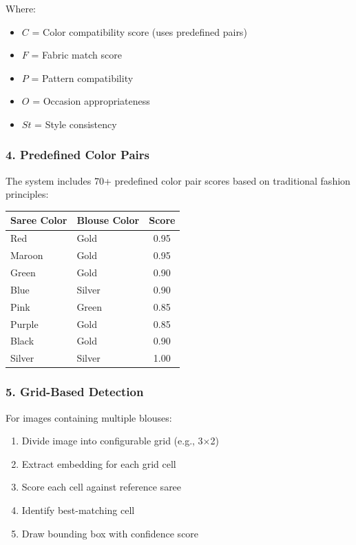 \documentclass[12pt,a4paper]{report}
\begin{document}
Where:
\begin{itemize}
    \item $C$ = Color compatibility score (uses predefined pairs)
    \item $F$ = Fabric match score
    \item $P$ = Pattern compatibility
    \item $O$ = Occasion appropriateness
    \item $St$ = Style consistency
\end{itemize}

\subsubsection{4. Predefined Color Pairs}

The system includes 70+ predefined color pair scores based on traditional fashion principles:

\begin{center}
\begin{tabular}{|l|l|c|}
\hline
\textbf{Saree Color} & \textbf{Blouse Color} & \textbf{Score} \\
\hline
Red & Gold & 0.95 \\
Maroon & Gold & 0.95 \\
Green & Gold & 0.90 \\
Blue & Silver & 0.90 \\
Pink & Green & 0.85 \\
Purple & Gold & 0.85 \\
Black & Gold & 0.90 \\
Silver & Silver & 1.00 \\
\hline
\end{tabular}
\end{center}

\subsubsection{5. Grid-Based Detection}

For images containing multiple blouses:
\begin{enumerate}
    \item Divide image into configurable grid (e.g., 3×2)
    \item Extract embedding for each grid cell
    \item Score each cell against reference saree
    \item Identify best-matching cell
    \item Draw bounding box with confidence score
\end{enumerate}
\end{document}
